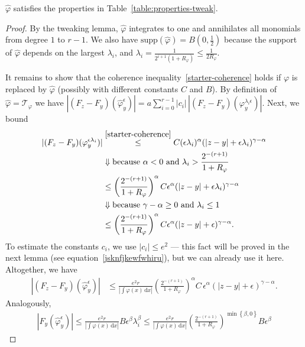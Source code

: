 \begin{lemma}\label{lemma:hat-phi-satisfies-table}
    \(\hat \varphi\) satisfies the properties in Table~\ref{table:properties-tweak}.
\end{lemma}
\begin{proof}
    By the tweaking lemma, \(\hat \varphi\) integrates to one and annihilates all monomials from degree \(1\) to \(r-1\). 
    We also have \(\mathrm{supp}(\hat \varphi) = B(0,\frac{1}{2})\) because the support of \(\hat \varphi\) depends on the largest \(\lambda_i\), and \(\lambda_i = \frac{1}{2^{i+1}(1+R_\varphi)} \leq \frac{1}{2R_\varphi}\). 
    
    It remains to show that the coherence inequality~\eqref{starter-coherence} holds if \(\varphi\) is replaced by \(\hat \varphi\) (possibly with different constants \(C\) and \(B\)). By definition of \(\hat \varphi = \mathcal{T}_\varphi\) we have \(|(F_z - F_y)(\hat \varphi^\epsilon_y)| = a\sum^{r-1}_{i=0} |c_i| \, |(F_z - F_y)(\varphi_y^{\lambda_i \epsilon})|\). Next, we bound
    \begin{align*}
        |(F_z - F_y)(\varphi_y^{ \epsilon \lambda_i})| &\overset{\eqref{starter-coherence}}{\leq}  C(\epsilon\lambda_i)^\alpha(|z-y| + \epsilon\lambda_i)^{\gamma-\alpha} \\
        &\Downarrow \text{because \(\alpha < 0\) and \(\lambda_i > \frac{2^{-(r+1)}}{1+R_\varphi}\)}\\
        &\leq  \left(\frac{2^{-(r+1)}}{1+R_\varphi}\right)^\alpha C\epsilon^\alpha(|z-y| + \epsilon\lambda_i)^{\gamma - \alpha} \\
        &\Downarrow \text{because \(\gamma - \alpha \geq 0\) and \(\lambda_i \leq 1\)}\\
        &\leq   \left(\frac{2^{-(r+1)}}{1+R_\varphi}\right)^\alpha C \epsilon^\alpha(|z-y| + \epsilon)^{\gamma - \alpha}.
    \end{align*}
    To estimate the constants \(c_i\), we use \(|c_i| \leq e^2\) --- this fact will be proved in the next lemma (see equation~\eqref{jsknfjkewfwhiru}), but we can already use it here. Altogether, we have  
    \begin{align*}
        |(F_z - F_y)(\hat \varphi^\epsilon_y)| &\leq \frac{e^2 r}{|\int \varphi(x)\, \mathrm{d}x|} \left(\frac{2^{-(r+1)}}{1+R_\varphi}\right)^\alpha C \, \epsilon^\alpha(|z-y| + \epsilon)^{\gamma - \alpha}.
    \end{align*}
    Analogously, 
    \begin{align*}
        |F_y(\hat \varphi^\epsilon_y)| \leq \frac{e^2 r}{|\int \varphi(x)\, \mathrm{d}x|} B \epsilon^\beta\lambda_i^\beta \leq  \frac{e^2 r}{|\int \varphi(x)\, \mathrm{d}x|}  \left(\frac{2^{-(r+1)}}{1+R_\varphi}\right)^{\min\left\{ \beta, 0 \right\} }B\epsilon^\beta

\end{align*}
\end{proof}
